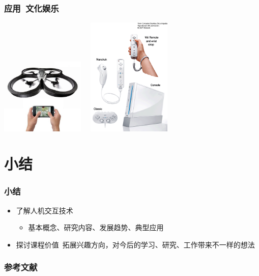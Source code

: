 \documentclass{beamer}
\begin{document}
\begin{frame}
	\frametitle{应用~{\small 文化娱乐}}
	\begin{center}
		\includegraphics[width=4cm]{images/ar-drone-parrot-quadricopter.jpg}~~
		\includegraphics[width=4cm]{images/wii.png}
	\end{center}
\end{frame}

\section{小结}
\begin{frame}
	\frametitle{小结}
	\begin{itemize}
		\item 了解人机交互技术
		\begin{itemize}
			\item {\small 基本概念、研究内容、发展趋势、典型应用}
		\end{itemize}
		\item 探讨课程价值~{\tiny 拓展兴趣方向，对今后的学习、研究、工作带来不一样的想法}
	\end{itemize}
\end{frame}

\begin{frame}
	\frametitle{参考文献}
	
	
\end{frame}
\end{document}
